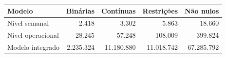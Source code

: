 \begin{tabular}{@{}lrrrr@{}}
\toprule
Modelo & Binárias & Contínuas & Restrições & Não nulos \\
\midrule
Nível semanal & 2.418 & 3.302 & 5.863 & 18.660 \\
Nível operacional & 28.245 & 57.248 & 108.009 & 399.824 \\
Modelo integrado & 2.235.324 & 11.180.880 & 11.018.742 & 67.285.792 \\
\bottomrule
\end{tabular}
